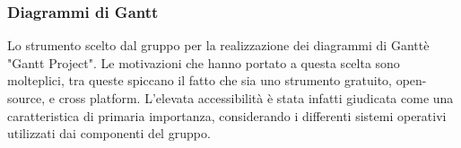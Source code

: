 \subsubsection{Diagrammi di Gantt}
	Lo strumento scelto dal gruppo per la realizzazione dei diagrammi di Gantt\glossario è "Gantt Project". Le 					motivazioni che hanno portato a questa scelta sono molteplici, tra queste spiccano il fatto che sia uno strumento 	gratuito, open-source\glossario, e cross platform. L'elevata accessibilità è stata infatti 				giudicata come una caratteristica di primaria importanza, considerando i differenti sistemi operativi utilizzati 		dai componenti del gruppo.
